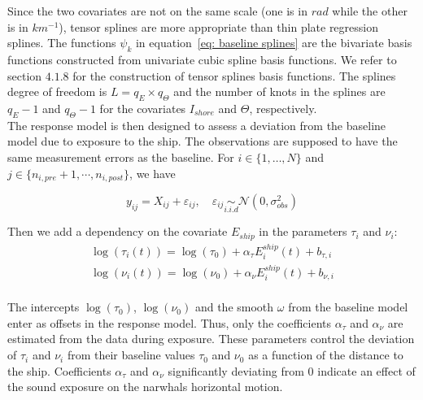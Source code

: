 \documentclass[aoas]{imsart}
\theoremstyle{definition}
\theoremstyle{remark}
\theoremstyle{remark}
\newcommand {\1}{\mathbb{1}}
\begin{document}
Since the two covariates are not on the same scale (one is in $rad$ while the other is in $km^{-1}$), tensor splines are more appropriate than thin plate regression splines.
The functions $\psi_k$ in equation~\eqref{eq: baseline splines} are the bivariate basis functions constructed from univariate cubic spline basis functions. We refer to \citep{wood_generalized_2017} section $4.
1.8$ for the construction of tensor splines basis functions. The splines degree of freedom is $L=q_E \times q_{\Theta}$ and the number of knots in the splines are $q_E-1$ and $q_{\Theta}-1$ for the covariates $I_{shore}$ and $\Theta$, respectively.\\


The response model is then designed to assess a deviation from the baseline model due to exposure to the ship. The observations are supposed to have the same measurement errors as the baseline. For $i \in \{1, \ldots, N\}$ and $j \in \{n_{i,pre}+1,\cdots,n_{i,post}\}$, we have

\begin{equation}  		y_{ij}=X_{ij}+\varepsilon_{ij}, \quad 		\varepsilon_{ij} \underset{i.i.d}{\sim} \mathcal{N}(0,\sigma_{obs}^2) 
	\label{eq: response observations}
\end{equation}

Then we add a dependency on the covariate $E_{ship}$ in the parameters $\tau_i$ and $\nu_i$: 
\begin{equation}    
	\begin{array}{l}
		\log(\tau_{i}(t))=\log(\tau_{0})+\alpha_{\tau} E^{ship}_i(t)+b_{\tau,i} \\
		\log(\nu_{i}(t))=\log(\nu_{0}) +  \alpha_{\nu} E^{ship}_i(t) +b_{\nu,i}  \\
	\end{array}
	\label{eq:response loglinear model}
\end{equation}


The intercepts $\log(\tau_0)$, $\log(\nu_0)$ and the smooth $\omega$ from the baseline model enter as offsets in the response model.
Thus, only the coefficients $\alpha_{\tau}$ and $\alpha_{\nu}$ are estimated from the data during exposure. These parameters control the deviation of $\tau_i$ and $\nu_i$ from their baseline values $\tau_0$ and $\nu_0$ as a function of the distance to the ship. Coefficients $\alpha_{\tau}$ and $\alpha_{\nu}$ significantly deviating from $0$ indicate an effect of the sound exposure on the narwhals horizontal motion.
\end{document}
